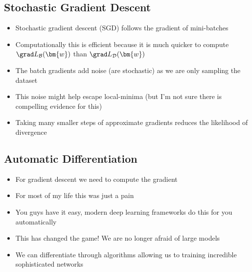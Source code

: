 
\begin{slide}
  \section{Stochastic Gradient Descent}

\begin{PauseHighLight}
  \begin{itemize}
  \item Stochastic gradient descent (SGD) follows the gradient of
    mini-batches\pause
  \item Computationally this is efficient because it is much quicker to
    compute $\grad L_{\mathcal{B}}(\bm{w})$ than $\grad
    L_{\mathcal{D}}(\bm{w})$\pause
  \item The batch gradients add noise (are stochastic) as we are only
    sampling the dataset\pause
  \item This noise might help escape local-minima\pause{} (but I'm not sure
    there is compelling evidence for this)\pauseb
  \item Taking many smaller steps of approximate gradients reduces the
    likelihood of divergence\pause
  \end{itemize}
\end{PauseHighLight}


\end{slide}


\begin{slide}
  \section{Automatic Differentiation}

\begin{PauseHighLight}
  \begin{itemize}
  \item For gradient descent we need to compute the gradient\pause
  \item For most of my life this was just a pain\pause
  \item You guys have it easy, modern deep learning frameworks do this
    for you automatically\pause
  \item This has changed the game!\pause{}  We are no longer afraid of
    large models\pause
  \item We can differentiate through algorithms allowing us to
    training incredible sophisticated networks\pause
  \end{itemize}
\end{PauseHighLight}


\end{slide}

